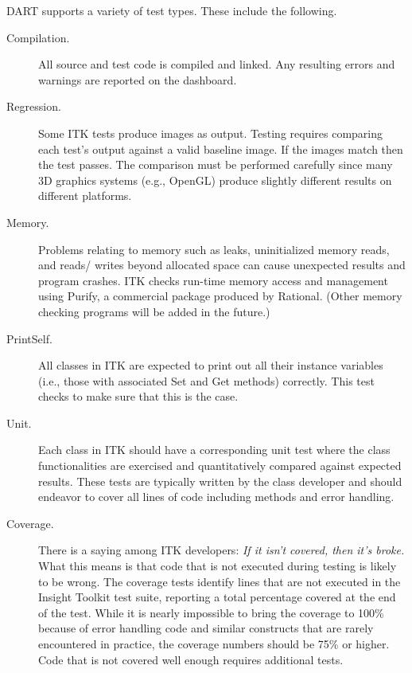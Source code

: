 DART supports a variety of test types. These include the following.
\begin{description}
        \item[Compilation.] All source and test code is compiled and linked. 
        Any resulting errors and warnings are reported on the dashboard.

        \item[Regression.] Some ITK tests produce images as output. Testing
        requires comparing each test's output against a valid baseline image. If
        the images match then the test passes. The comparison must be
        performed carefully since many 3D graphics systems (e.g., OpenGL)
        produce slightly different results on different platforms.

        \item[Memory.] Problems relating to memory such as leaks, uninitialized
        memory reads, and reads/ writes beyond allocated space can cause 
        unexpected results and program crashes. ITK checks run-time memory 
        access and management using Purify, a commercial package produced by 
        Rational. (Other memory checking programs will be added in the future.)

        \item[PrintSelf.] All classes in ITK are expected to print out all
        their instance variables (i.e., those with associated Set and Get 
        methods) correctly. This test checks to make sure
        that this is the case.

        \item[Unit.] Each class in ITK should have a corresponding unit test
        where the class functionalities are exercised and quantitatively
        compared against expected results. These tests are typically written
        by the class developer and should endeavor to cover all lines of code
        including  methods and error handling.

       \item[Coverage.] There is a saying among ITK developers: \emph{If it
        isn't covered, then it's broke.} What this means is that
        code that is not executed during testing is likely to be wrong. The
        coverage tests identify lines that are not executed in the
        Insight Toolkit test suite, reporting a total percentage
        covered at the end of the test. While it is nearly impossible to
        bring the coverage to 100\% because of error handling code and similar
        constructs that are rarely encountered in practice, the coverage
        numbers should be 75\% or higher. Code that is not covered well enough
        requires additional tests.
\end{description}

